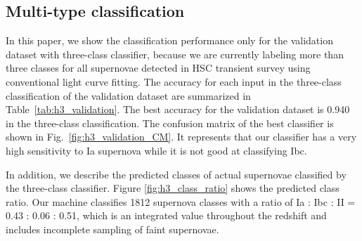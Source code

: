 \documentclass[useamsfonts]{pasj01}
\begin{document}
\subsection{Multi-type classification}
\label{sec:h3}
%
In this paper, we show the classification performance only for the validation dataset with three-class classifier, because we are currently labeling more than three classes for all supernovae detected in HSC transient survey using conventional light curve fitting.
%
The accuracy for each input in the three-class classification of the validation dataset are summarized in Table\ \ref{tab:h3_validation}.
The best accuracy for the validation dataset is 0.940 in the three-class classification.
The confusion matrix of the best classifier is shown in Fig.\ \ref{fig:h3_validation_CM}.
It represents that our classifier has a very high sensitivity to Ia supernova while it is not good at classifying Ibc.

In addition, we describe the predicted classes of actual supernovae classified by the three-class classifier.
Figure \ref{fig:h3_class_ratio} shows the predicted class ratio.
Our machine classifies 1812 supernova classes with a ratio of Ia : Ibc : II = 0.43 : 0.06 : 0.51, which 
is an integrated value throughout the redshift and includes incomplete sampling of faint supernovae.
\end{document}

